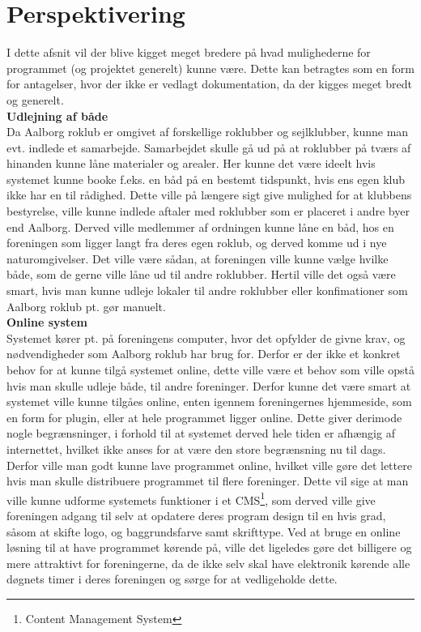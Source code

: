 
\chapter{Perspektivering}
\label{sec:Perspektivering}
I dette afsnit vil der blive kigget meget bredere på hvad mulighederne for programmet (og projektet generelt) kunne være. Dette kan betragtes som en form for antagelser, hvor der ikke er vedlagt dokumentation, da der kigges meget bredt og generelt.\\

\textbf{Udlejning af både}\\
Da Aalborg roklub er omgivet af forskellige roklubber og sejlklubber, kunne man evt. indlede et samarbejde. Samarbejdet skulle gå ud på at roklubber på tværs af hinanden kunne låne materialer og arealer. Her kunne det være ideelt hvis systemet kunne booke f.eks. en båd på en bestemt tidspunkt, hvis ens egen klub ikke har en til rådighed. Dette ville på længere sigt give mulighed for at klubbens bestyrelse, ville kunne indlede aftaler med roklubber som er placeret i andre byer end Aalborg. Derved ville medlemmer af ordningen kunne låne en båd, hos en foreningen som ligger langt fra deres egen roklub, og derved komme ud i nye naturomgivelser. Det ville være sådan, at foreningen ville kunne vælge hvilke både, som de gerne ville låne ud til andre roklubber. Hertil ville det også være smart, hvis man kunne udleje lokaler til andre roklubber eller konfimationer som Aalborg roklub pt. gør manuelt.\\

\textbf{Online system}\\
Systemet kører pt. på foreningens computer, hvor det opfylder de givne krav, og nødvendigheder som Aalborg roklub har brug for. Derfor er der ikke et konkret behov for at kunne tilgå systemet online, dette ville være et behov som ville opstå hvis man skulle udleje både, til andre foreninger. Derfor kunne det være smart at systemet ville kunne tilgåes online, enten igennem foreningernes hjemmeside, som en form for plugin, eller at hele programmet ligger online. Dette giver derimode nogle begrænsninger, i forhold til at systemet derved hele tiden er afhængig af internettet, hvilket ikke anses for at være den store begrænsning nu til dags. Derfor ville man godt kunne lave programmet online, hvilket ville gøre det lettere hvis man skulle distribuere programmet til flere foreninger. Dette vil sige at man ville kunne udforme systemets funktioner i et CMS\footnote{Content Management System}, som derved ville give foreningen adgang til selv at opdatere deres program design til en hvis grad, såsom at skifte logo, og baggrundsfarve samt skrifttype. Ved at bruge en online løsning til at have programmet kørende på, ville det ligeledes gøre det billigere og mere attraktivt for foreningerne, da de ikke selv skal have elektronik kørende alle døgnets timer i deres foreningen og sørge for at vedligeholde dette.\\

